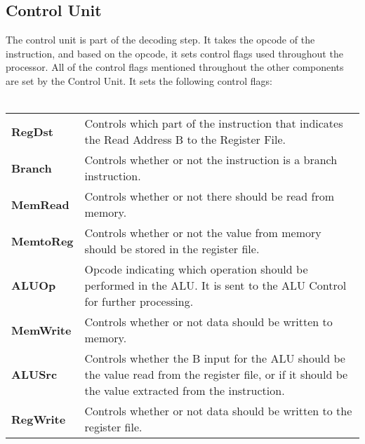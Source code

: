 \subsection{Control Unit} \label{sec:control-unit}
The control unit is part of the decoding step. It takes the opcode of the
instruction, and based on the opcode, it sets control flags used throughout the
processor. All of the control flags mentioned throughout the other components
are set by the Control Unit. It sets the following control flags:\\\\
\begin{tabular}{lp{9cm}}
    \bf{RegDst} & Controls which part of the instruction that indicates the
        Read Address B to the Register File. \\

    \bf{Branch} & Controls whether or not the instruction is a branch
        instruction. \\

    \bf{MemRead} & Controls whether or not there should be read from memory. \\

    \bf{MemtoReg} & Controls whether or not the value from memory should be
        stored in the register file. \\

    \bf{ALUOp} & Opcode indicating which operation should be performed in
        the ALU. It is sent to the ALU Control for further processing. \\

    \bf{MemWrite} & Controls whether or not data should be written to memory. \\

    \bf{ALUSrc} & Controls whether the B input for the ALU should be the
        value read from the register file, or if it should be the value
        extracted from the instruction. \\

    \bf{RegWrite} & Controls whether or not data should be written to the
        register file. \\
\end{tabular}\\

